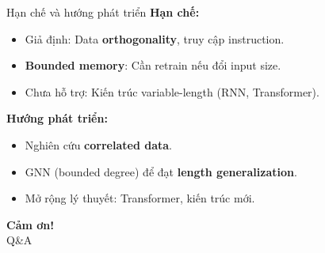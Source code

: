 \begin{frame}{Hạn chế và hướng phát triển}
  \textbf{Hạn chế:}
  \begin{itemize}
    \item Giả định: Data \textbf{orthogonality}, truy cập instruction.
    \item \textbf{Bounded memory}: Cần retrain nếu đổi input size.
    \item Chưa hỗ trợ: Kiến trúc variable-length (RNN, Transformer).
  \end{itemize}

  \vspace{0.3cm}
  \textbf{Hướng phát triển:}
  \begin{itemize}
    \item Nghiên cứu \textbf{correlated data}.
    \item GNN (bounded degree) để đạt \textbf{length generalization}.
    \item Mở rộng lý thuyết: Transformer, kiến trúc mới.
  \end{itemize}
\end{frame}

\begin{frame}{}
  \centering
  \vfill
  {\Huge \textbf{Cảm ơn!}}\\[0.5cm]
  {\Large Q\&A}
  \vfill
\end{frame}
